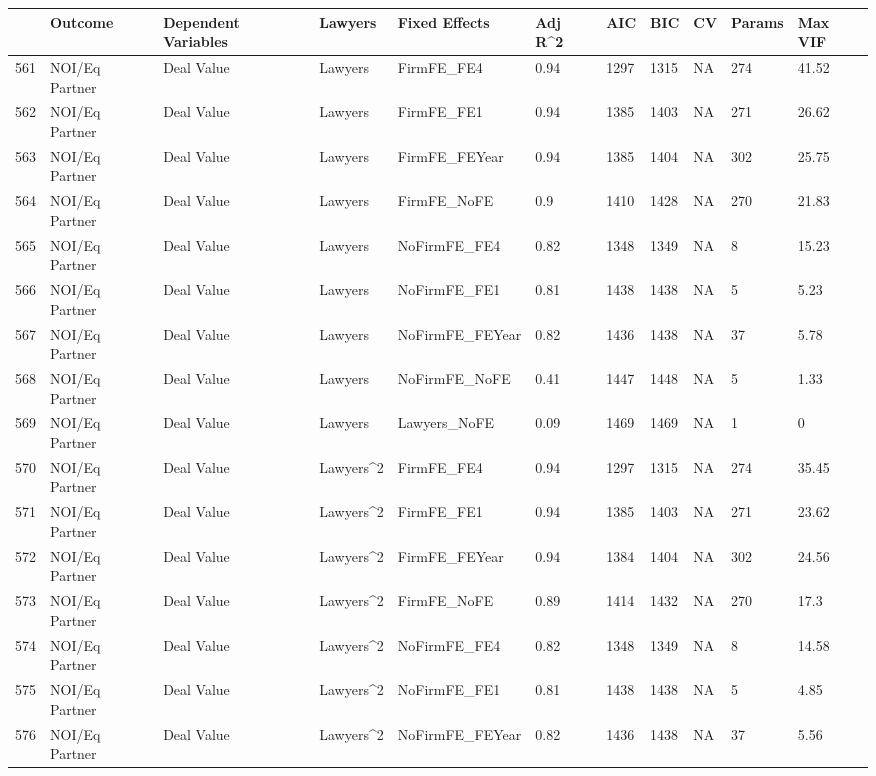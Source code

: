 \documentclass{article}
\begin{document}
\begin{table}[H]
\centering
\begin{tabular}{rllllllllll}
  \hline
 & Outcome & Dependent Variables & Lawyers & Fixed Effects & Adj R^2 & AIC & BIC & CV & Params & Max VIF \\ 
  \hline
561 & NOI/Eq Partner & Deal Value & Lawyers & FirmFE\_FE4 & 0.94 & 1297 & 1315 & NA & 274 & 41.52 \\ 
  562 & NOI/Eq Partner & Deal Value & Lawyers & FirmFE\_FE1 & 0.94 & 1385 & 1403 & NA & 271 & 26.62 \\ 
  563 & NOI/Eq Partner & Deal Value & Lawyers & FirmFE\_FEYear & 0.94 & 1385 & 1404 & NA & 302 & 25.75 \\ 
  564 & NOI/Eq Partner & Deal Value & Lawyers & FirmFE\_NoFE & 0.9 & 1410 & 1428 & NA & 270 & 21.83 \\ 
  565 & NOI/Eq Partner & Deal Value & Lawyers & NoFirmFE\_FE4 & 0.82 & 1348 & 1349 & NA & 8 & 15.23 \\ 
  566 & NOI/Eq Partner & Deal Value & Lawyers & NoFirmFE\_FE1 & 0.81 & 1438 & 1438 & NA & 5 & 5.23 \\ 
  567 & NOI/Eq Partner & Deal Value & Lawyers & NoFirmFE\_FEYear & 0.82 & 1436 & 1438 & NA & 37 & 5.78 \\ 
  568 & NOI/Eq Partner & Deal Value & Lawyers & NoFirmFE\_NoFE & 0.41 & 1447 & 1448 & NA & 5 & 1.33 \\ 
  569 & NOI/Eq Partner & Deal Value & Lawyers & Lawyers\_NoFE & 0.09 & 1469 & 1469 & NA & 1 & 0 \\ 
  570 & NOI/Eq Partner & Deal Value & Lawyers^2 & FirmFE\_FE4 & 0.94 & 1297 & 1315 & NA & 274 & 35.45 \\ 
  571 & NOI/Eq Partner & Deal Value & Lawyers^2 & FirmFE\_FE1 & 0.94 & 1385 & 1403 & NA & 271 & 23.62 \\ 
  572 & NOI/Eq Partner & Deal Value & Lawyers^2 & FirmFE\_FEYear & 0.94 & 1384 & 1404 & NA & 302 & 24.56 \\ 
  573 & NOI/Eq Partner & Deal Value & Lawyers^2 & FirmFE\_NoFE & 0.89 & 1414 & 1432 & NA & 270 & 17.3 \\ 
  574 & NOI/Eq Partner & Deal Value & Lawyers^2 & NoFirmFE\_FE4 & 0.82 & 1348 & 1349 & NA & 8 & 14.58 \\ 
  575 & NOI/Eq Partner & Deal Value & Lawyers^2 & NoFirmFE\_FE1 & 0.81 & 1438 & 1438 & NA & 5 & 4.85 \\ 
  576 & NOI/Eq Partner & Deal Value & Lawyers^2 & NoFirmFE\_FEYear & 0.82 & 1436 & 1438 & NA & 37 & 5.56 \\ 

\end{tabular}
\end{table}
\end{document}
